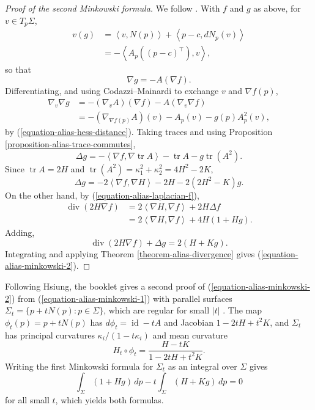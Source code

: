 \begin{proof}[Proof of the second
Minkowski formula]
We follow
\cite[pp.~23--25]{alias2006analisis}.
With $f$ and $g$ as above, for
$v\in T_p\Sigma$,
$$
\begin{aligned}
v(g)&=\left\langle{} v,N(p)
\right\rangle{}+\left\langle{} p-c,
dN_p(v)\right\rangle{}\\
&=-\left\langle{} A_p((p-c)^{\top}),v
\right\rangle{},
\end{aligned}
$$
so that
$$
\nabla g=-A(\nabla f).
$$
Differentiating, and using
Codazzi--Mainardi to exchange $v$ and
$\nabla f(p)$,
$$
\begin{aligned}
\nabla_v\nabla g
&=-(\nabla_vA)(\nabla f)
-A(\nabla_v\nabla f)\\
&=-(\nabla_{\nabla f(p)}A)(v)
-A_p(v)-g(p)A_p^2(v),
\end{aligned}
$$
by (\ref{equation-alias-hess-distance}).
Taking traces and using Proposition
\ref{proposition-alias-trace-commutes},
$$
\Delta g=-\left\langle{} \nabla f,
\nabla\operatorname{tr}A\right\rangle{}
-\operatorname{tr}A
-g\operatorname{tr}(A^2).
$$
Since $\operatorname{tr}A=2H$ and
$\operatorname{tr}(A^2)
=\kappa_1^2+\kappa_2^2=4H^2-2K$,
\begin{equation}
\label{equation-alias-laplacian-g}
\Delta g=-2\left\langle{} \nabla f,
\nabla H\right\rangle{}-2H
-2(2H^2-K)g.
\end{equation}
On the other hand, by
(\ref{equation-alias-laplacian-f}),
$$
\begin{aligned}
\operatorname{div}(2H\nabla f)
&=2\left\langle{} \nabla H,\nabla f
\right\rangle{}+2H\Delta f\\
&=2\left\langle{} \nabla H,\nabla f
\right\rangle{}+4H(1+Hg).
\end{aligned}
$$
Adding,
$$
\operatorname{div}(2H\nabla f)+\Delta g
=2(H+Kg).
$$
Integrating and applying Theorem
\ref{theorem-alias-divergence} gives
(\ref{equation-alias-minkowski-2}).
\end{proof}

\begin{remark}
\label{remark-alias-parallel-surfaces}
Following Hsiung, the booklet gives a
second proof of
(\ref{equation-alias-minkowski-2}) from
(\ref{equation-alias-minkowski-1}) with
parallel surfaces
$\Sigma_t=\{p+tN(p):p\in\Sigma\}$, which
are regular for small $|t|$
\cite[Section 3.3,
pp.~26--29]{alias2006analisis}. The map
$\phi_t(p)=p+tN(p)$ has
$d\phi_t=\operatorname{id}-tA$ and
Jacobian $1-2tH+t^2K$, and $\Sigma_t$ has
principal curvatures
$\kappa_i/(1-t\kappa_i)$ and mean
curvature
$$
H_t\circ\phi_t
=\frac{H-tK}{1-2tH+t^2K}.
$$
Writing the first Minkowski formula for
$\Sigma_t$ as an integral over $\Sigma$
gives
$$
\int_\Sigma(1+Hg)\,dp
-t\int_\Sigma(H+Kg)\,dp=0
$$
for all small $t$, which yields both
formulas.
\end{remark}

